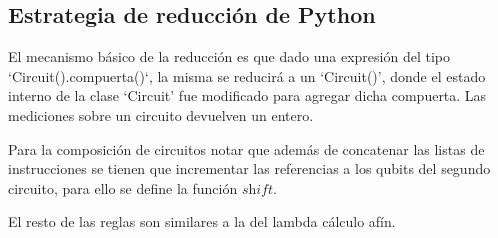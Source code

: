 \subsection{Estrategia de reducción de Python}
El mecanismo básico de la reducción es que dado una expresión del tipo `Circuit().compuerta()`, la misma se reducirá a un `Circuit()', donde el estado interno de la clase `Circuit' fue modificado para agregar dicha compuerta. Las mediciones sobre un circuito devuelven un entero.

Para la composición de circuitos notar que además de concatenar las listas de instrucciones se tienen que incrementar las referencias a los qubits del segundo circuito, para ello se define la función $\textit{shift}$.

El resto de las reglas son similares a la del lambda cálculo afín.

